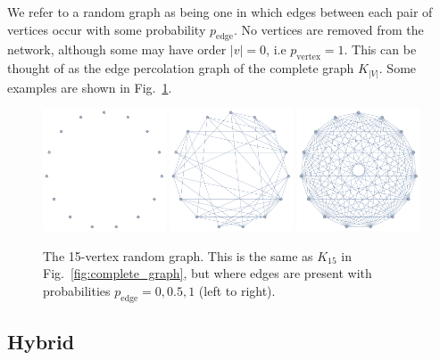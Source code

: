 We refer to a random graph as being one in which edges between each pair of vertices occur with some probability $p_\mathrm{edge}$. No vertices are removed from the network, although some may have order \mbox{$|v|=0$}, i.e \mbox{$p_\mathrm{vertex}=1$}. This can be thought of as the edge percolation graph of the complete graph $K_{|V|}$. Some examples are shown in Fig.~\ref{fig:random_graph}.

\begin{figure}[!htbp]
\includegraphics[width=0.325\textwidth]{random_0}
\includegraphics[width=0.325\textwidth]{random_05}
\includegraphics[width=0.325\textwidth]{random_1}
\caption{The 15-vertex random graph. This is the same as $K_{15}$ in Fig.~\ref{fig:complete_graph}, but where edges are present with probabilities \mbox{$p_\mathrm{edge}=0,0.5,1$} (left to right).} \label{fig:random_graph}
\end{figure}

%
%

\subsection{Hybrid} 

